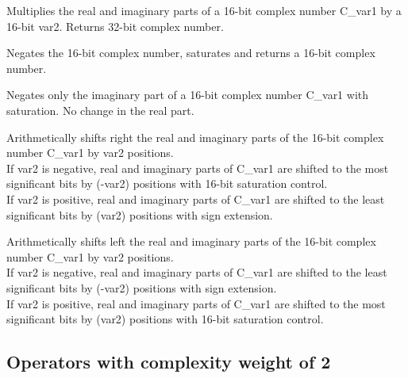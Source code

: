 
Multiplies the real and imaginary parts of a 16-bit complex number C\_var1 by a 16-bit var2.
Returns 32-bit complex number.


Negates the 16-bit complex number, saturates and returns a 16-bit complex number.


Negates only the imaginary part of a 16-bit complex number C\_var1 with saturation.
No change in the real part.


Arithmetically shifts right the real and imaginary parts of the 16-bit complex number C\_var1 by var2 positions.\\
If var2 is negative, real and imaginary parts of C\_var1 are shifted to the most significant bits by (-var2) positions with 16-bit saturation control.\\
If var2 is positive, real and imaginary parts of C\_var1 are shifted to the least significant bits by (var2) positions with sign extension.


Arithmetically shifts left the real and imaginary parts of the 16-bit complex number C\_var1 by var2 positions.\\
If var2 is negative, real and imaginary parts of C\_var1 are shifted to the least significant bits by (-var2) positions with sign extension.\\
If var2 is positive, real and imaginary parts of C\_var1 are shifted to the most significant bits by (var2) positions with 16-bit saturation control.

\subsection{Operators with complexity weight of 2}


